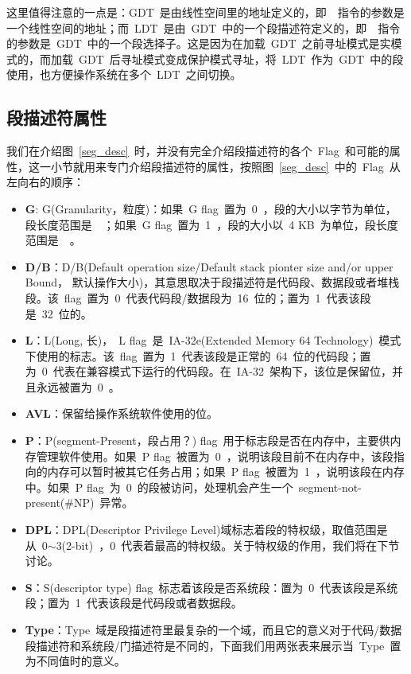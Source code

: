 这里值得注意的一点是：GDT~是由线性空间里的地址定义的，即~~指令的参数是一个线性空间的地址；而~LDT~是由~GDT~中的一个段描述符定义的，即~~指令的参数是~GDT~中的一个段选择子。这是因为在加载~GDT~之前寻址模式是实模式的，而加载~GDT~后寻址模式变成保护模式寻址，将~LDT~作为~GDT~中的段使用，也方便操作系统在多个~LDT~之间切换。

\subsection{段描述符属性} \label{CHpm_desattr}

我们在介绍图~\ref{seg_desc}~时，并没有完全介绍段描述符的各个~Flag~和可能的属性，这一小节就用来专门介绍段描述符的属性，按照图~\ref{seg_desc}~中的~Flag~从左向右的顺序：

\begin{itemize}
\item{\textbf{G}}: G(Granularity，粒度)：如果~G flag~置为~0~，段的大小以字节为单位，段长度范围是~~；如果~G flag~置为~1~，段的大小以~4 KB~为单位，段长度范围是~~。
\item{\textbf{D/B}}：D/B(Default operation size/Default stack pionter size and/or upper Bound， 默认操作大小)，其意思取决于段描述符是代码段、数据段或者堆栈段。该~flag~置为~0~代表代码段/数据段为~16~位的；置为~1~代表该段是~32~位的。
\item{\textbf{L}}：L(Long, 长)，~L flag~是~IA-32e(Extended Memory 64 Technology)~模式下使用的标志。该~flag~置为~1~代表该段是正常的~64~位的代码段；置为~0~代表在兼容模式下运行的代码段。在~IA-32~架构下，该位是保留位，并且永远被置为~0~。
\item{\textbf{AVL}}：保留给操作系统软件使用的位。
\item{\textbf{P}}：P(segment-Present，段占用？) flag~用于标志段是否在内存中，主要供内存管理软件使用。如果~P flag~被置为~0~，说明该段目前不在内存中，该段指向的内存可以暂时被其它任务占用；如果~P flag~被置为~1~，说明该段在内存中。如果~P flag~为~0~的段被访问，处理机会产生一个~segment-not-present(\#NP)~异常。
\item{\textbf{DPL}}：DPL(Descriptor Privilege Level)域标志着段的特权级，取值范围是从~0$\sim$3(2-bit)~，0~代表着最高的特权级。关于特权级的作用，我们将在下节讨论。
\item{\textbf{S}}：S(descriptor type) flag~标志着该段是否系统段：置为~0~代表该段是系统段；置为~1~代表该段是代码段或者数据段。
\item{\textbf{Type}}：Type~域是段描述符里最复杂的一个域，而且它的意义对于代码/数据段描述符和系统段/门描述符是不同的，下面我们用两张表来展示当~Type~置为不同值时的意义。


\end{itemize}
